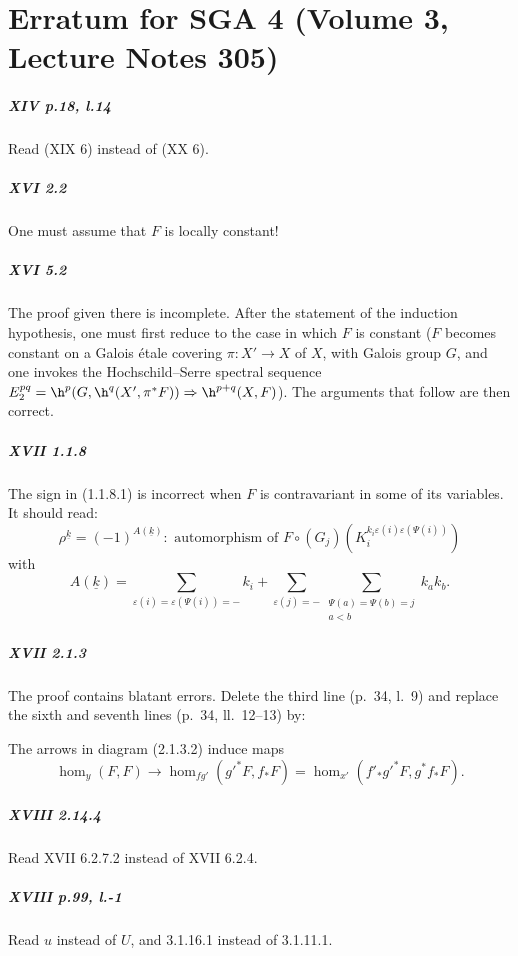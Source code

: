 
\appendix
{}\chapter{Erratum for SGA 4 (Volume 3, Lecture Notes 305)}

\paragraph{XIV p.18, l.14}
Read (XIX 6) instead of (XX 6).

\paragraph{XVI 2.2}
One must assume that $F$ is locally constant!

\paragraph{XVI 5.2}
The proof given there is incomplete. After the statement of the induction
hypothesis, one must first reduce to the case in which $F$ is constant
($F$ becomes constant on a Galois \'etale covering $\pi:X'\to X$ of $X$,
with Galois group $G$, and one invokes the Hochschild--Serre spectral sequence
$E_2^{p q}=\h^p(G,\h^q(X',\pi^\ast F))\Rightarrow \h^{p+q}(X,F)$).
The arguments that follow are then correct.

\paragraph{XVII 1.1.8}
The sign in (1.1.8.1) is incorrect when $F$ is contravariant in some of its
variables. It should read:
\begin{equation*}\tag{1.1.8.1}
  \rho^{\underline k} = (-1)^{A(\underline k)}: \text{ automorphism of }
F\circ (G_j)\left(K_i^{k_i\varepsilon(i)\varepsilon(\Psi(i))}\right)
\end{equation*}
with
\[
  A(\underline k) = \sum_{\varepsilon(i) = \varepsilon(\Psi(i))=-} k_i + \sum_{\varepsilon(j)=-} \sum_{\substack{\Psi(a)=\Psi(b)=j \\ a<b}} k_a k_b .
\]

\paragraph{XVII 2.1.3}
The proof contains blatant errors. Delete the third line (p.~34, l.~9) and
replace the sixth and seventh lines (p.~34, ll.~12--13) by:

The arrows in diagram (2.1.3.2) induce maps
\[
  \hom_y(F,F) \to \hom_{f g'}({g'}^\ast F,f_\ast F) = \hom_{x'}(f'_\ast {g'}^\ast F,g^\ast f_\ast F) \text{.}
\]

\paragraph{XVIII 2.14.4}
Read XVII 6.2.7.2 instead of XVII 6.2.4.

\paragraph{XVIII p.99, l.-1}
Read $u$ instead of $U$, and 3.1.16.1 instead of 3.1.11.1.

